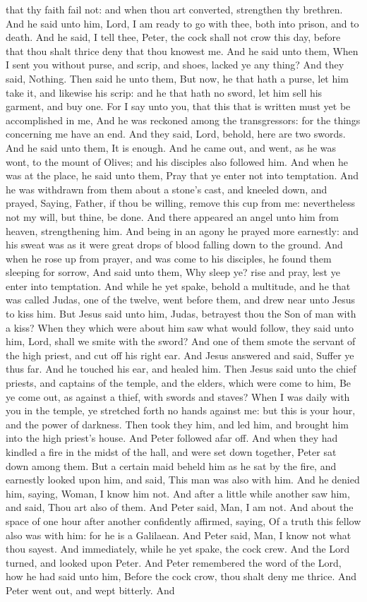 that thy faith fail not: and when thou art converted, strengthen thy brethren. And he said unto him, Lord, I am ready to go with thee, both into prison, and to death. And he said, I tell thee, Peter, the cock shall not crow this day, before that thou shalt thrice deny that thou knowest me. And he said unto them, When I sent you without purse, and scrip, and shoes, lacked ye any thing? And they said, Nothing. Then said he unto them, But now, he that hath a purse, let him take it, and likewise his scrip: and he that hath no sword, let him sell his garment, and buy one. For I say unto you, that this that is written must yet be accomplished in me, And he was reckoned among the transgressors: for the things concerning me have an end. And they said, Lord, behold, here are two swords. And he said unto them, It is enough. And he came out, and went, as he was wont, to the mount of Olives; and his disciples also followed him. And when he was at the place, he said unto them, Pray that ye enter not into temptation. And he was withdrawn from them about a stone's cast, and kneeled down, and prayed, Saying, Father, if thou be willing, remove this cup from me: nevertheless not my will, but thine, be done. And there appeared an angel unto him from heaven, strengthening him. And being in an agony he prayed more earnestly: and his sweat was as it were great drops of blood falling down to the ground. And when he rose up from prayer, and was come to his disciples, he found them sleeping for sorrow, And said unto them, Why sleep ye? rise and pray, lest ye enter into temptation. And while he yet spake, behold a multitude, and he that was called Judas, one of the twelve, went before them, and drew near unto Jesus to kiss him. But Jesus said unto him, Judas, betrayest thou the Son of man with a kiss? When they which were about him saw what would follow, they said unto him, Lord, shall we smite with the sword? And one of them smote the servant of the high priest, and cut off his right ear. And Jesus answered and said, Suffer ye thus far. And he touched his ear, and healed him. Then Jesus said unto the chief priests, and captains of the temple, and the elders, which were come to him, Be ye come out, as against a thief, with swords and staves? When I was daily with you in the temple, ye stretched forth no hands against me: but this is your hour, and the power of darkness. Then took they him, and led him, and brought him into the high priest's house. And Peter followed afar off. And when they had kindled a fire in the midst of the hall, and were set down together, Peter sat down among them. But a certain maid beheld him as he sat by the fire, and earnestly looked upon him, and said, This man was also with him. And he denied him, saying, Woman, I know him not. And after a little while another saw him, and said, Thou art also of them. And Peter said, Man, I am not. And about the space of one hour after another confidently affirmed, saying, Of a truth this fellow also was with him: for he is a Galilaean. And Peter said, Man, I know not what thou sayest. And immediately, while he yet spake, the cock crew. And the Lord turned, and looked upon Peter. And Peter remembered the word of the Lord, how he had said unto him, Before the cock crow, thou shalt deny me thrice. And Peter went out, and wept bitterly. And 